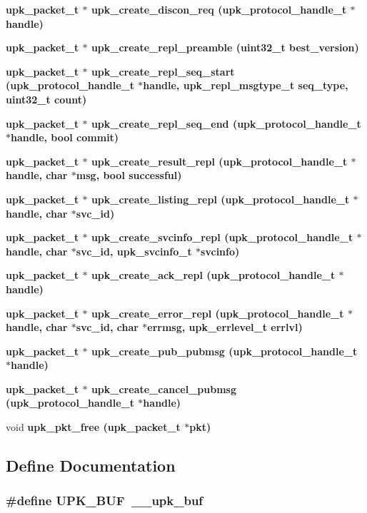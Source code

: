 \begin{CompactItemize}
\bf{upk\_\-packet\_\-t} $\ast$ \bf{upk\_\-create\_\-discon\_\-req} (\bf{upk\_\-protocol\_\-handle\_\-t} $\ast$handle)
\item 
\bf{upk\_\-packet\_\-t} $\ast$ \bf{upk\_\-create\_\-repl\_\-preamble} (uint32\_\-t best\_\-version)
\item 
\bf{upk\_\-packet\_\-t} $\ast$ \bf{upk\_\-create\_\-repl\_\-seq\_\-start} (\bf{upk\_\-protocol\_\-handle\_\-t} $\ast$handle, \bf{upk\_\-repl\_\-msgtype\_\-t} seq\_\-type, uint32\_\-t count)
\item 
\bf{upk\_\-packet\_\-t} $\ast$ \bf{upk\_\-create\_\-repl\_\-seq\_\-end} (\bf{upk\_\-protocol\_\-handle\_\-t} $\ast$handle, bool commit)
\item 
\bf{upk\_\-packet\_\-t} $\ast$ \bf{upk\_\-create\_\-result\_\-repl} (\bf{upk\_\-protocol\_\-handle\_\-t} $\ast$handle, char $\ast$msg, bool successful)
\item 
\bf{upk\_\-packet\_\-t} $\ast$ \bf{upk\_\-create\_\-listing\_\-repl} (\bf{upk\_\-protocol\_\-handle\_\-t} $\ast$handle, char $\ast$svc\_\-id)
\item 
\bf{upk\_\-packet\_\-t} $\ast$ \bf{upk\_\-create\_\-svcinfo\_\-repl} (\bf{upk\_\-protocol\_\-handle\_\-t} $\ast$handle, char $\ast$svc\_\-id, \bf{upk\_\-svcinfo\_\-t} $\ast$svcinfo)
\item 
\bf{upk\_\-packet\_\-t} $\ast$ \bf{upk\_\-create\_\-ack\_\-repl} (\bf{upk\_\-protocol\_\-handle\_\-t} $\ast$handle)
\item 
\bf{upk\_\-packet\_\-t} $\ast$ \bf{upk\_\-create\_\-error\_\-repl} (\bf{upk\_\-protocol\_\-handle\_\-t} $\ast$handle, char $\ast$svc\_\-id, char $\ast$errmsg, \bf{upk\_\-errlevel\_\-t} errlvl)
\item 
\bf{upk\_\-packet\_\-t} $\ast$ \bf{upk\_\-create\_\-pub\_\-pubmsg} (\bf{upk\_\-protocol\_\-handle\_\-t} $\ast$handle)
\item 
\bf{upk\_\-packet\_\-t} $\ast$ \bf{upk\_\-create\_\-cancel\_\-pubmsg} (\bf{upk\_\-protocol\_\-handle\_\-t} $\ast$handle)
\item 
void \bf{upk\_\-pkt\_\-free} (\bf{upk\_\-packet\_\-t} $\ast$pkt)
\end{CompactItemize}


\subsection{Define Documentation}
\subsubsection{\setlength{\rightskip}{0pt plus 5cm}\#define UPK\_\-BUF~\_\-\_\-upk\_\-buf}\label{upk__protocol_8h_e1d1e2f91d6faf59c3e3b422cf816da2}


